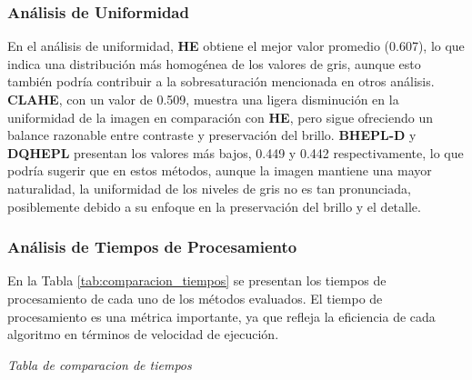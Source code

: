 \documentclass[sigchi]{acmart}
\begin{document}
\subsubsection{Análisis de Uniformidad}
\label{subsubsec:analisis_uniformidad}

En el análisis de uniformidad, \textbf{HE} obtiene el mejor valor promedio (0.607), lo que
indica una distribución más homogénea de los valores de gris, aunque esto también podría
contribuir a la sobresaturación mencionada en otros análisis. \textbf{CLAHE}, con un valor de
0.509, muestra una ligera disminución en la uniformidad de la imagen en comparación con
\textbf{HE}, pero sigue ofreciendo un balance razonable entre contraste y preservación del
brillo. \textbf{BHEPL-D} y \textbf{DQHEPL} presentan los valores más bajos, 0.449 y 0.442
respectivamente, lo que podría sugerir que en estos métodos, aunque la imagen mantiene una
mayor naturalidad, la uniformidad de los niveles de gris no es tan pronunciada, posiblemente
debido a su enfoque en la preservación del brillo y el detalle.

\subsubsection{Análisis de Tiempos de Procesamiento}
\label{subsubsec:analisis_tiempos}

En la Tabla \ref{tab:comparacion_tiempos} se presentan los tiempos de procesamiento de cada uno
de los métodos evaluados. El tiempo de procesamiento es una métrica importante, ya que refleja
la eficiencia de cada algoritmo en términos de velocidad de ejecución.

\begin{table}[H]
	\caption{Comparación de tiempos de procesamiento}
	\label{tab:comparacion_tiempos}
	\small

	\vspace{0.5em}
	\footnotesize%
	\textit{Tabla de comparacion de tiempos}
\end{table}
\end{document}
